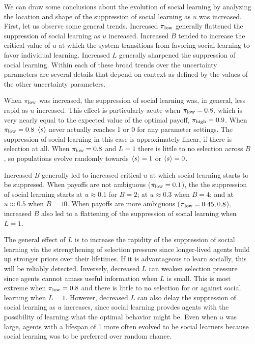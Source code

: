 \documentclass[letterpaper,11.5pt]{scrartcl}
\begin{document}
We can draw some conclusions about the evolution of social learning by analyzing the
location and shape of the suppression of social learning as $u$ was increased.
First, let us observe some general trends. Increased $\pi_{\mathrm{low}}$ generally
flattened the suppression of social learning as $u$ increased.  
Increased $B$ tended to increase the critical value of $u$ at which the 
system transitions from favoring social learning to favor individual learning.  
Increased $L$ generally sharpened the suppression of social learning.
Within each of these broad trends over the uncertainty parameters are several
details that depend on context as defined by the values of the other uncertainty
parameters.

When $\pi_{\mathrm{low}}$ was increased, the suppression of social learning was, in
general, less rapid as $u$ increased. This effect is particularly acute when
$\pi_{\mathrm{low}} = 0.8$, which is very nearly equal to the expected value of the optimal
payoff, $\pi_{\mathrm{high}} = 0.9$. When $\pi_{\mathrm{low}} = 0.8$ $\langle s \rangle$ never actually reaches 
1 or 0 for any parameter settings. The suppression of social learning in this
case is approximately linear, if there is selection at all. When $\pi_{\mathrm{low}} = 0.8$
and $L = 1$ there is little to no selection across $B$, 
so populations evolve randomly towards $\langle s \rangle = 1$ or $\langle s \rangle = 0$. 

Increased $B$ generally led to increased critical $u$ at which social learning
starts to be suppresed. When payoffs are not ambiguous ($\pi_{\mathrm{low}} = 0.1$), the the
suppression of social learning starts at $u \approx 0.1$ for $B=2$; at $u \approx
0.3$ when $B=4$; and at $u \approx 0.5$ when $B=10$.  When payoffs are more
ambiguous ($\pi_{\mathrm{low}} = 0.45,0.8$), increased $B$ also led to a flattening of the
suppression of social learning when $L=1$. 

The general effect of $L$ is to increase the rapidity of the suppression of social
learning via the strengthening of selection pressure since longer-lived agents
build up stronger priors over their lifetimes. If it is advantageous to
learn socially, this will be reliably detected. Inversely, decreased $L$
can weaken selection pressure since agents cannot amass useful information when
$L$ is small. This is most extreme when $\pi_{\mathrm{low}} = 0.8$ and there is little to
no selection for or against social learning when $L=1$. However, decreased $L$ can
also delay the suppression of social learning as $u$ increases, since social
learning provdes agents with the possibility of learning what the optimal behavior
might be.  Even when $u$ was large, agents with a lifespan of 1 more often evolved
to be social learners because social learning was to be preferred over random
chance.
\end{document}
